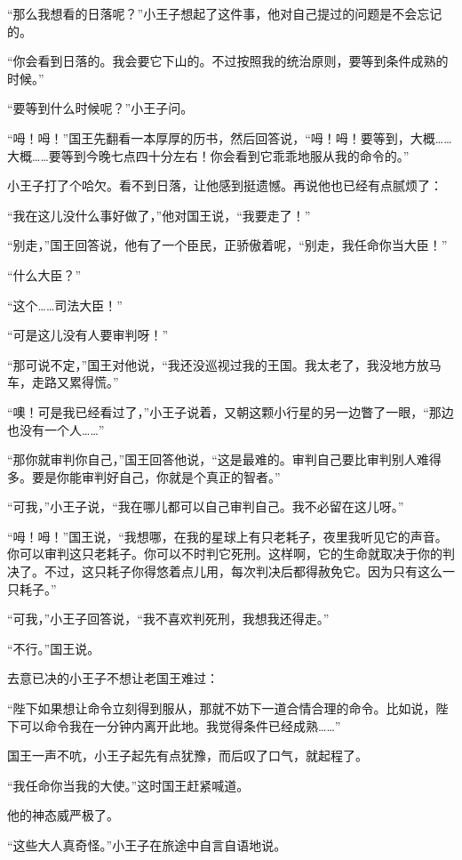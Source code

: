 “那么我想看的日落呢？”小王子想起了这件事，他对自己提过的问题是不会忘记的。

“你会看到日落的。我会要它下山的。不过按照我的统治原则，要等到条件成熟的时候。”

“要等到什么时候呢？”小王子问。

“呣！呣！”国王先翻看一本厚厚的历书，然后回答说，“呣！呣！要等到，大概\ldots{}\ldots{}大概\ldots{}\ldots{}要等到今晚七点四十分左右！你会看到它乖乖地服从我的命令的。”

小王子打了个哈欠。看不到日落，让他感到挺遗憾。再说他也已经有点腻烦了：

“我在这儿没什么事好做了，”他对国王说，“我要走了！”

“别走，”国王回答说，他有了一个臣民，正骄傲着呢，“别走，我任命你当大臣！”

“什么大臣？”

“这个\ldots{}\ldots{}司法大臣！”

“可是这儿没有人要审判呀！”

“那可说不定，”国王对他说，“我还没巡视过我的王国。我太老了，我没地方放马车，走路又累得慌。”

“噢！可是我已经看过了，”小王子说着，又朝这颗小行星的另一边瞥了一眼，“那边也没有一个人\ldots{}\ldots{}”

“那你就审判你自己，”国王回答他说，“这是最难的。审判自己要比审判别人难得多。要是你能审判好自己，你就是个真正的智者。”

“可我，”小王子说，“我在哪儿都可以自己审判自己。我不必留在这儿呀。”

“呣！呣！”国王说，“我想哪，在我的星球上有只老耗子，夜里我听见它的声音。你可以审判这只老耗子。你可以不时判它死刑。这样啊，它的生命就取决于你的判决了。不过，这只耗子你得悠着点儿用，每次判决后都得赦免它。因为只有这么一只耗子。”

“可我，”小王子回答说，“我不喜欢判死刑，我想我还得走。”

“不行。”国王说。

去意已决的小王子不想让老国王难过：

“陛下如果想让命令立刻得到服从，那就不妨下一道合情合理的命令。比如说，陛下可以命令我在一分钟内离开此地。我觉得条件已经成熟\ldots{}\ldots{}”

国王一声不吭，小王子起先有点犹豫，而后叹了口气，就起程了。

“我任命你当我的大使。”这时国王赶紧喊道。

他的神态威严极了。

“这些大人真奇怪。”小王子在旅途中自言自语地说。


